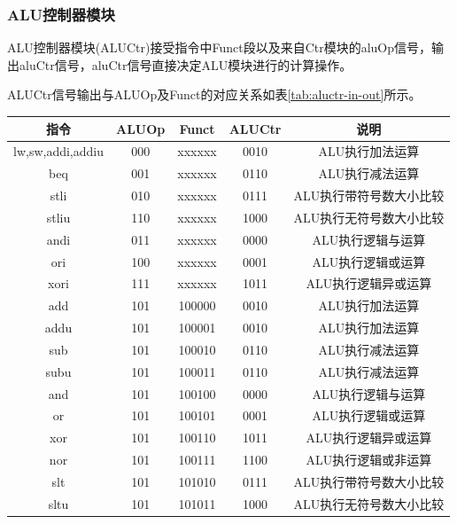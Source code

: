 \documentclass[UTF8]{ctexart}
\begin{document}
\subsubsection{ALU控制器模块}
    ALU控制器模块(ALUCtr)接受指令中Funct段以及来自Ctr模块的aluOp信号，输出aluCtr信号，aluCtr信号直接决定ALU模块进行的计算操作。\par
    ALUCtr信号输出与ALUOp及Funct的对应关系如表\ref{tab:aluctr-in-out}所示。
    \begin{table}[htbp]
    \centering
    \begin{tabular}{|c|c|c|c|c|}
    \hline
    指令               & ALUOp & Funct  & ALUCtr & 说明            \\ 
    \hline
    lw,sw,addi,addiu & 000   & xxxxxx & 0010   & ALU执行加法运算     \\
    beq              & 001   & xxxxxx & 0110   & ALU执行减法运算     \\
    stli             & 010   & xxxxxx & 0111   & ALU执行带符号数大小比较 \\
    stliu            & 110   & xxxxxx & 1000   & ALU执行无符号数大小比较 \\
    andi             & 011   & xxxxxx & 0000   & ALU执行逻辑与运算    \\
    ori              & 100   & xxxxxx & 0001   & ALU执行逻辑或运算    \\
    xori             & 111   & xxxxxx & 1011   & ALU执行逻辑异或运算   \\
    add              & 101   & 100000 & 0010   & ALU执行加法运算     \\
    addu             & 101   & 100001 & 0010   & ALU执行加法运算     \\
    sub              & 101   & 100010 & 0110   & ALU执行减法运算     \\
    subu             & 101   & 100011 & 0110   & ALU执行减法运算     \\
    and              & 101   & 100100 & 0000   & ALU执行逻辑与运算    \\
    or               & 101   & 100101 & 0001   & ALU执行逻辑或运算    \\
    xor              & 101   & 100110 & 1011   & ALU执行逻辑异或运算   \\
    nor              & 101   & 100111 & 1100   & ALU执行逻辑或非运算   \\
    slt              & 101   & 101010 & 0111   & ALU执行带符号数大小比较 \\
    sltu             & 101   & 101011 & 1000   & ALU执行无符号数大小比较 \\

\end{tabular}
\end{table}
\end{document}

